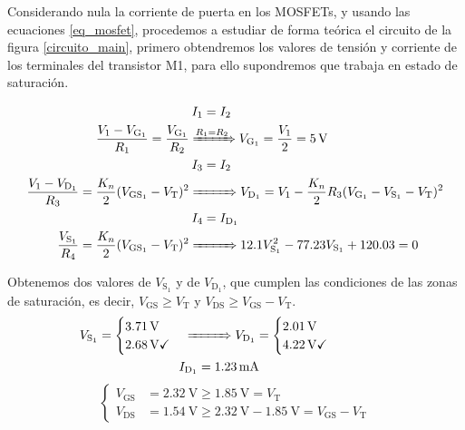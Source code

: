 \documentclass[11pt,a4paper]{article}
\begin{document}
		Considerando nula la corriente de puerta en los MOSFETs, y usando las ecuaciones \ref{eq_mosfet}, procedemos a estudiar de forma teórica el circuito de la figura \ref{circuito_main}, primero obtendremos los valores de tensión y corriente de los terminales del transistor M1, para ello supondremos que trabaja en estado de saturación.

		\begin{align*}
			&\hspace{2pt}I_1 = I_2 \\
			\frac{V_1 - V_{\mathrm{G}_1}}{R_1} = \frac{V_{\mathrm{G}_1}}{R_2} &\xRightarrow{R_1 = R_2} V_{\mathrm{G}_1} = \frac{V_1}{2} = \SI{5}{\volt} \\
			&\hspace{2pt}I_3 = I_2 \\
			\frac{V_1 - V_{\mathrm{D}_1}}{R_3} = \frac{K_n}{2}(V_{\mathrm{GS}_1} - V_{\mathrm{T}})^2 &\xRightarrow{\hspace{27pt}} V_{\mathrm{D}_1} = V_1 - \frac{K_n}{2}R_3(V_{\mathrm{G}_1}-V_{\mathrm{S}_1}-V_{\mathrm{T}})^2 \\
			&\hspace{2pt}I_4 = I_{\mathrm{D}_1} \\
			\frac{V_{\mathrm{S}_1}}{R_4} = \frac{K_n}{2}(V_{\mathrm{GS}_1} - V_{\mathrm{T}})^2 &\xRightarrow{\hspace{27pt}} 12.1V_{\mathrm{S}_1}^2 - 77.23V_{\mathrm{S}_1} + 120.03 = 0
		\end{align*}

		Obtenemos dos valores de $V_{\mathrm{S}_1}$ y de $V_{\mathrm{D}_1}$, que cumplen las condiciones de las zonas de saturación, es decir, $V_{\mathrm{GS}} \geq V_{\mathrm{T}}$ y $V_{\mathrm{DS}} \geq V_{\mathrm{GS}} -  V_{\mathrm{T}}$.
		\begin{align*}
			\hspace{-39pt}V_{\mathrm{S}_1} =
			\begin{cases}
				\SI{3,71}{\volt} \\
				\SI{2,68}{\volt} \checkmark
			\end{cases} &\xRightarrow{\hspace{27pt}}
			V_{\mathrm{D}_1} =
			\begin{cases}
				\SI{2,01}{\volt} \\
				\SI{4,22}{\volt} \checkmark
			\end{cases} \\
			&\hspace{-4pt}I_{\mathrm{D}_1} = \SI{1,23}{\milli\ampere}
		\end{align*}
		\begin{equation*}
			\begin{cases}
				V_\mathrm{GS} &= \SI{2.32}{\volt} \geq \SI{1.85}{\volt} =  V_\mathrm{T}\\
				V_\mathrm{DS} &= \SI{1.54}{\volt} \geq \SI{2.32}{\volt}-\SI{1.85}{\volt} = V_\mathrm{GS} - V_\mathrm{T}
			\end{cases}
		\end{equation*}
\end{document}
